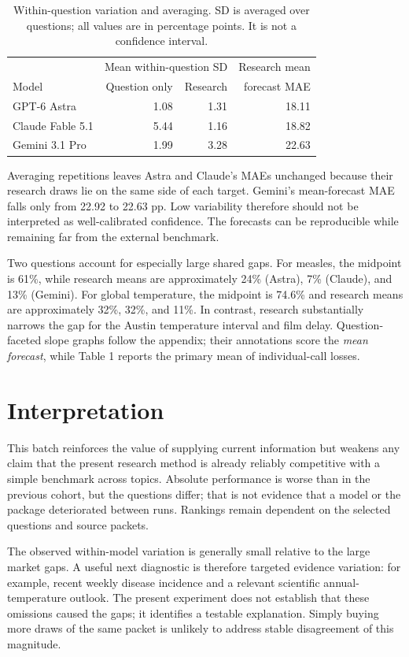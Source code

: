 \documentclass[11pt]{article}
\begin{document}
\begin{table}[htbp]\centering
\caption{Within-question variation and averaging. SD is averaged over questions; all values are in percentage points. It is not a confidence interval.}
\begin{tabular}{lrrr}\toprule
 & \multicolumn{2}{c}{Mean within-question SD} & Research mean\\
Model & Question only & Research & forecast MAE\\\midrule
GPT-6 Astra & 1.08 & 1.31 & 18.11\\
Claude Fable 5.1 & 5.44 & 1.16 & 18.82\\
Gemini 3.1 Pro & 1.99 & 3.28 & 22.63\\
\bottomrule\end{tabular}
\end{table}

Averaging repetitions leaves Astra and Claude's MAEs unchanged because their
research draws lie on the same side of each target. Gemini's mean-forecast
MAE falls only from 22.92 to 22.63 pp. Low variability therefore should not
be interpreted as well-calibrated confidence. The forecasts can be reproducible
while remaining far from the external benchmark.

Two questions account for especially large shared gaps. For measles, the
midpoint is 61\%, while research means are approximately 24\% (Astra), 7\%
(Claude), and 13\% (Gemini). For global temperature, the midpoint is 74.6\%
and research means are approximately 32\%, 32\%, and 11\%. In contrast,
research substantially narrows the gap for the Austin temperature interval
and film delay. Question-faceted slope graphs follow the appendix; their
annotations score the \emph{mean forecast}, while Table 1 reports the primary
mean of individual-call losses.

\section{Interpretation}
This batch reinforces the value of supplying current information but weakens
any claim that the present research method is already reliably competitive
with a simple benchmark across topics. Absolute performance is worse than in
the previous cohort, but the questions differ; that is not evidence that a
model or the package deteriorated between runs. Rankings remain dependent on
the selected questions and source packets.

The observed within-model variation is generally small relative to the large
market gaps. A useful next diagnostic is therefore targeted evidence variation:
for example, recent weekly disease incidence and a relevant scientific
annual-temperature outlook. The present experiment does not establish that
these omissions caused the gaps; it identifies a testable explanation. Simply
buying more draws of the same packet is unlikely to address stable disagreement
of this magnitude.
\end{document}
